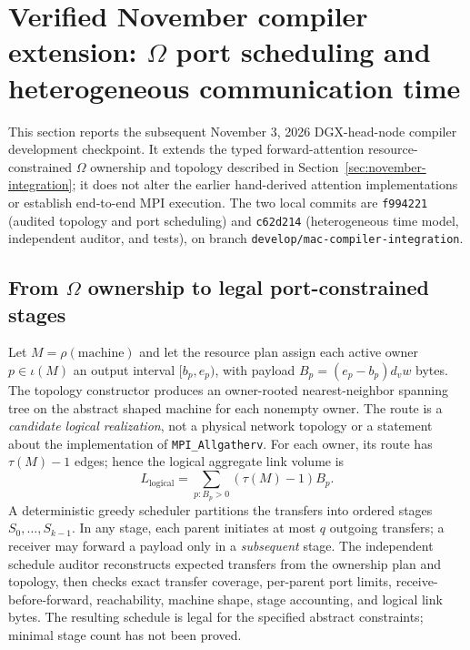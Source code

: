 \documentclass[11pt]{article}
\begin{document}
\clearpage
\section{Verified November compiler extension: $\Omega$ port scheduling and heterogeneous communication time}
\label{sec:nov-verified-communication}
This section reports the subsequent November 3, 2026 DGX-head-node
compiler development checkpoint. It extends the typed forward-attention
resource-constrained $\Omega$ ownership and topology described in
Section~\ref{sec:november-integration}; it does not alter the earlier
hand-derived attention implementations or establish end-to-end MPI execution.
The two local commits are \texttt{f994221} (audited topology and port
scheduling) and \texttt{c62d214} (heterogeneous time model, independent
auditor, and tests), on branch \texttt{develop/mac-compiler-integration}.

\subsection{From $\Omega$ ownership to legal port-constrained stages}
Let $M=\rho(\mathrm{machine})$ and let the resource plan assign each active
owner $p\in\iota(M)$ an output interval $[b_p,e_p)$, with payload
$B_p=(e_p-b_p)d_v w$ bytes. The topology constructor produces an
owner-rooted nearest-neighbor spanning tree on the abstract shaped
machine for each nonempty owner. The route is a \emph{candidate logical
realization}, not a physical network topology or a statement about the
implementation of \texttt{MPI\_Allgatherv}. For each owner, its route has
$\tau(M)-1$ edges; hence the logical aggregate link volume is
\begin{equation}
 L_{\mathrm{logical}}=\sum_{p:B_p>0}(\tau(M)-1)B_p.
 \label{eq:nov39-linkbytes}
\end{equation}
A deterministic greedy scheduler partitions the transfers into ordered
stages $S_0,\ldots,S_{k-1}$. In any stage, each parent initiates at most
$q$ outgoing transfers; a receiver may forward a payload only in a
\emph{subsequent} stage. The independent schedule auditor reconstructs
expected transfers from the ownership plan and topology, then checks
exact transfer coverage, per-parent port limits, receive-before-forward,
reachability, machine shape, stage accounting, and logical link bytes.
The resulting schedule is legal for the specified abstract constraints;
minimal stage count has not been proved.
\end{document}
